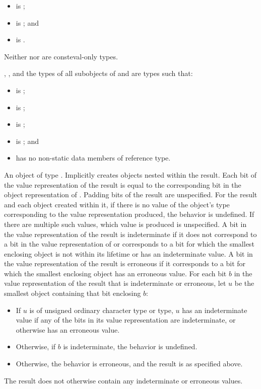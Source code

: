 \begin{itemdescr}
\pnum
\constraints
\begin{itemize}
\item {} is ;
\item {} is ; and
\item {} is .
\end{itemize}

\pnum
\mandates
Neither  nor  are consteval-only types.

\pnum
\constantwhen
{}, , and the types of all subobjects
of  and  are types  such that:
\begin{itemize}
\item {} is ;
\item {} is ;
\item {} is ;
\item {} is ; and
\item {} has no non-static data members of reference type.
\end{itemize}

\pnum
\returns
An object of type .
Implicitly creates objects nested within the result.
Each bit of the value representation of the result
is equal to the corresponding bit in the object representation
of . Padding bits of the result are unspecified.
For the result and each object created within it,
if there is no value of the object's type corresponding to the
value representation produced, the behavior is undefined.
If there are multiple such values, which value is produced is unspecified.
A bit in the value representation of the result is indeterminate if
it does not correspond to a bit in the value representation of  or
corresponds to a bit
for which the smallest enclosing object is not within its lifetime or
has an indeterminate value.
A bit in the value representation of the result is erroneous
if it corresponds to a bit
for which the smallest enclosing object has an erroneous value.
For each bit $b$ in the value representation of the result
that is indeterminate or erroneous,
let $u$ be the smallest object containing that bit enclosing $b$:
\begin{itemize}
\item
If $u$ is of unsigned ordinary character type or  type,
$u$ has an indeterminate value
if any of the bits in its value representation are indeterminate, or
otherwise has an erroneous value.
\item
Otherwise, if $b$ is indeterminate, the behavior is undefined.
\item
Otherwise, the behavior is erroneous, and the result is as specified above.
\end{itemize}
The result does not otherwise contain any indeterminate or erroneous values.
\end{itemdescr}


